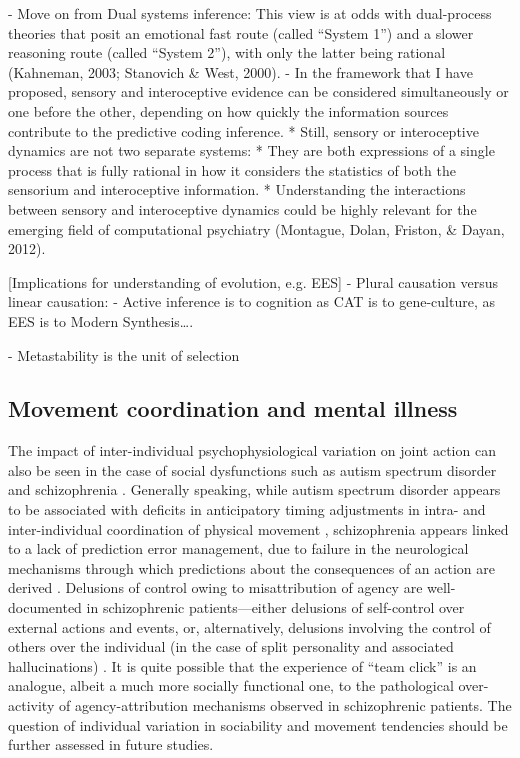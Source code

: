    - Move on from Dual systems inference:
        This view is at odds with dual-process theories that posit an emotional fast route (called “System 1”) and a slower reasoning route (called “System 2”), with only the latter being rational (Kahneman, 2003; Stanovich & West, 2000).
        - In the framework that I have proposed, sensory and interoceptive evidence can be considered simultaneously or one before the other, depending on how quickly the information sources contribute to the predictive coding inference.
        * Still, sensory or interoceptive dynamics are not two separate systems:
            * They are both expressions of a single process that is fully rational in how it considers the statistics of both the sensorium and interoceptive information.
            * Understanding the interactions between sensory and interoceptive dynamics could be highly relevant for the emerging field of computational psychiatry (Montague, Dolan, Friston, & Dayan, 2012).

  [Implications for understanding of evolution, e.g. EES]
      - Plural causation versus linear causation:
      - Active inference is to cognition as CAT is to gene-culture, as EES is to Modern Synthesis….


      - Metastability is the unit of selection










\subsection{Movement coordination and mental illness}
   The impact of inter-individual psychophysiological variation on joint action can also be seen in the case of social dysfunctions such as autism spectrum disorder \citep{Isenhower2012} and schizophrenia \citep{Varlet2012}.  Generally speaking,  while autism spectrum disorder appears to be associated with deficits in anticipatory timing adjustments in intra- and inter-individual coordination of physical movement \citep{Martineau2010}, schizophrenia appears linked to a lack of prediction error management, due to failure in the neurological mechanisms through which predictions about the consequences of an action are derived \citep{Frith2000}.  Delusions of control owing to misattribution of agency are well-documented in schizophrenic patients---either delusions of self-control over external actions and events, or, alternatively, delusions involving the control of others over the individual (in the case of split personality and associated hallucinations) \citep{Frith2007}. It is quite possible that the experience of ``team click'' is an analogue, albeit a much more socially functional one, to the pathological over-activity of agency-attribution mechanisms observed in schizophrenic patients.  The question of individual variation in sociability and movement tendencies should be further assessed in future studies.


